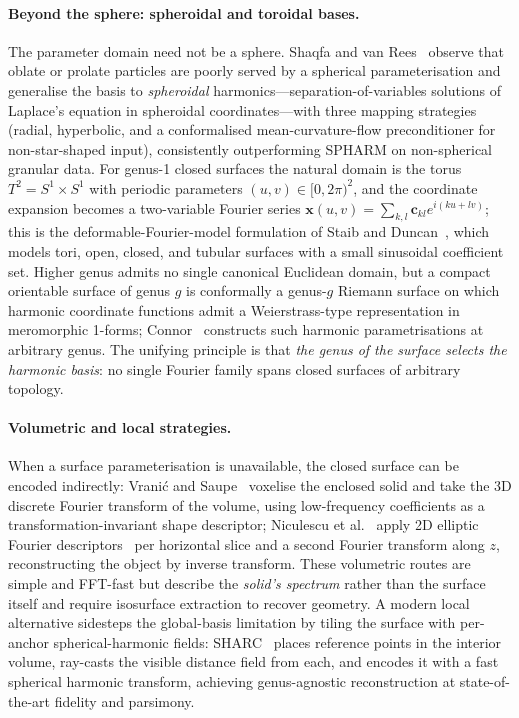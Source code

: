 \paragraph{Beyond the sphere: spheroidal and toroidal bases.}
The parameter domain need not be a sphere. Shaqfa and van
Rees~\cite{shaqfarees2024soh} observe that oblate or prolate particles
are poorly served by a spherical parameterisation and generalise the
basis to \emph{spheroidal} harmonics---separation-of-variables solutions
of Laplace's equation in spheroidal coordinates---with three mapping
strategies (radial, hyperbolic, and a conformalised mean-curvature-flow
preconditioner for non-star-shaped input), consistently outperforming
SPHARM on non-spherical granular data. For genus-1 closed surfaces the
natural domain is the torus $T^{2}=S^{1}\!\times\!S^{1}$ with periodic
parameters $(u,v)\in[0,2\pi)^{2}$, and the coordinate expansion becomes
a two-variable Fourier series
$\mathbf{x}(u,v)=\sum_{k,l}\mathbf{c}_{kl}e^{i(ku+lv)}$; this is the
deformable-Fourier-model formulation of Staib and
Duncan~\cite{staibduncan1996}, which models tori, open, closed, and
tubular surfaces with a small sinusoidal coefficient set. Higher genus
admits no single canonical Euclidean domain, but a compact orientable
surface of genus $g$ is conformally a genus-$g$ Riemann surface on which
harmonic coordinate functions admit a Weierstrass-type representation in
meromorphic 1-forms; Connor~\cite{connor2016harmonic} constructs such
harmonic parametrisations at arbitrary genus. The unifying principle is
that \emph{the genus of the surface selects the harmonic basis}: no
single Fourier family spans closed surfaces of arbitrary topology.

\paragraph{Volumetric and local strategies.}
When a surface parameterisation is unavailable, the closed surface can
be encoded indirectly: Vrani{\'c} and Saupe~\cite{vranisaupe2001dft}
voxelise the enclosed solid and take the 3D discrete Fourier transform
of the volume, using low-frequency coefficients as a
transformation-invariant shape descriptor; Niculescu
et al.~\cite{niculescu2002doubleefd} apply 2D elliptic Fourier
descriptors~\cite{kuhlgiardina1982} per horizontal slice and a second
Fourier transform along $z$, reconstructing the object by inverse
transform. These volumetric routes are simple and FFT-fast but describe
the \emph{solid's spectrum} rather than the surface itself and require
isosurface extraction to recover geometry. A modern local alternative
sidesteps the global-basis limitation by tiling the surface with
per-anchor spherical-harmonic fields: SHARC~\cite{sapoutzoglou2026sharc}
places reference points in the interior volume, ray-casts the visible
distance field from each, and encodes it with a fast spherical harmonic
transform, achieving genus-agnostic reconstruction at state-of-the-art
fidelity and parsimony.

